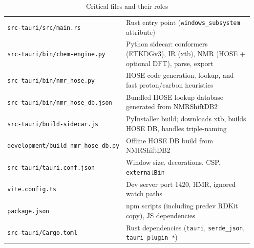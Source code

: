 \documentclass[11pt,a4paper]{article}
\begin{document}
\begin{table}[h!]
\begin{tabularx}{\textwidth}{@{} l X @{}}
\texttt{src-tauri/src/main.rs} & Rust entry point (\texttt{windows\_subsystem} attribute) \\
\texttt{src-tauri/bin/chem-engine.py} & Python sidecar: conformers (ETKDGv3), IR (xtb), NMR (HOSE + optional DFT), parse, export \\
\texttt{src-tauri/bin/nmr\_hose.py} & HOSE code generation, lookup, and fast proton/carbon heuristics \\
\texttt{src-tauri/bin/nmr\_hose\_db.json} & Bundled HOSE lookup database generated from NMRShiftDB2 \\
\texttt{src-tauri/build-sidecar.js} & PyInstaller build; downloads xtb, builds HOSE DB, handles triple-naming \\
\texttt{development/build\_nmr\_hose\_db.py} & Offline HOSE DB build from NMRShiftDB2 \\
\texttt{src-tauri/tauri.conf.json} & Window size, decorations, CSP, \texttt{externalBin} \\
\texttt{vite.config.ts} & Dev server port 1420, HMR, ignored watch paths \\
\texttt{package.json} & npm scripts (including predev RDKit copy), JS dependencies \\
\texttt{src-tauri/Cargo.toml} & Rust dependencies (\texttt{tauri}, \texttt{serde\_json}, \texttt{tauri-plugin-*}) \\
\bottomrule
\end{tabularx}
\caption{Critical files and their roles}
\end{table}
\end{document}
